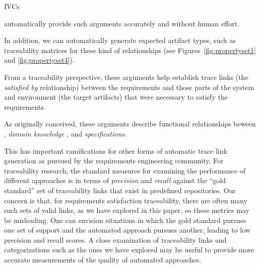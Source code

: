 IVCs

automatically provide such arguments accurately and without human effort.

In addition, we can automatically generate expected artifact types, such as traceability matrices for these kind of relationships (see Figures~\ref{fig:propertyset1} and \ref{fig:propertyset4}).


From a traceability perspective, these arguments help establish trace links (the \emph{satisfied by} relationship) between the requirements and those parts of the system and environment (the target artifacts) that were necessary to satisfy the requirements.

As originally conceived, these arguments describe functional relationships beween {\requirements}, {\em domain knowledge} , and {\em specifications}.


%

This has important ramifications for other forms of automatic trace link generation as pursued by the requirements engineering community.
For traceability research, the standard measures for examining the performance of different approaches is in terms of {\em precision} and {\em recall} against the ``gold standard'' set of traceability links that exist in predefined repositories.  Our concern is that, for requirements satisfaction traceability, there are often many such sets of valid links, as we have explored in this paper, so these metrics may be misleading.  One can envision situations in which the gold standard pursues one set of support and the automated approach pursues another, leading to low precision and recall scores.  A close examination of traceability links and categorizations such as the ones we have explored may be useful to provide more accurate measurements of the quality of automated approaches.
\fi
